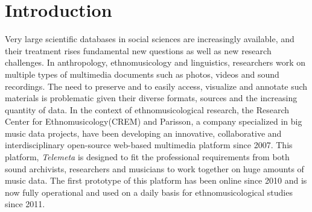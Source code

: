 \documentclass{sig-alternate}
\newcommand{\CREM}{Research Center for Ethnomusicology}
\begin{document}
%
\maketitle
%
\begin{abstract}
The Archive CNRS-Musée de l’Homme is one of the most important collection of ethnomusicological recordings in Europe.
Since 2007, ethnomusicologists and engineers have joint their effort to develop a scalable and collaborative web platform for managing and have a better access to these digital sound archives. This platform has been deployed since 2011 and hold the archives of CNRS-Musée de l’Homme managed by the \emph{\CREM}.
This web platform is based on \emph{Telemeta}, an open-source web audio framework dedicated to digital sound archives secure storing, indexing and publishing. It focuses on the enhanced and collaborative user-experience in accessing audio items and their associated metadata and on the possibility for the expert users to further enrich those metadata.
 Telemeta architecture relies on \emph{TimeSide}, an open audio processing framework mainly written in Python language which provides decoding,  encoding and streaming methods for various formats together with a smart embeddable HTML audio player. TimeSide also includes a set of audio analysis plugins and additionally wraps several audio features extraction libraries to provide automatic annotation, segmentation and musicological analysis.
\end{abstract}
\section{Introduction}\label{sec:intro}
 Very large scientific databases in social sciences are increasingly available, and their treatment rises fundamental new questions as well as new research challenges. 
In anthropology, ethnomusicology and linguistics, researchers work on multiple types of multimedia documents such as photos, videos and sound recordings. The need to preserve and to easily access, visualize and annotate such materials is problematic given their diverse formats, sources and the increasing quantity of data.
 In the context of ethnomusicological research, the \CREM (CREM) and Parisson, a company specialized in big music data projects, have been developing an innovative, collaborative and interdisciplinary open-source web-based multimedia platform since 2007. 
 This platform, \emph{Telemeta} is designed to fit the professional requirements from both sound archivists, researchers and musicians to work together on huge amounts of music data. The first prototype of this platform has been online since 2010 and is now fully operational and used on a daily basis for ethnomusicological studies since 2011. 
\end{document}
